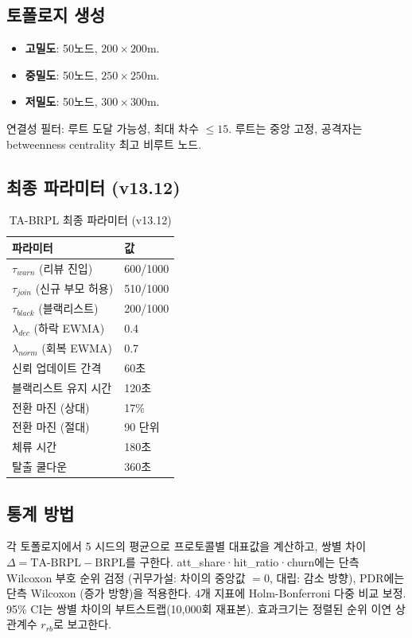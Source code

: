 \documentclass[12pt,a4paper]{article}
\begin{document}
\subsection{토폴로지 생성}

\begin{itemize}
  \item \textbf{고밀도}: 50노드, $200\times200$m.
  \item \textbf{중밀도}: 50노드, $250\times250$m.
  \item \textbf{저밀도}: 50노드, $300\times300$m.
\end{itemize}
연결성 필터: 루트 도달 가능성, 최대 차수 $\le 15$.
루트는 중앙 고정,
공격자는 betweenness centrality 최고 비루트 노드.

\subsection{최종 파라미터 (v13.12)}

\begin{table}[htbp]
\centering
\caption{TA-BRPL 최종 파라미터 (v13.12)}
\label{tab:params}
\begin{tabular}{ll}
\toprule
파라미터 & 값 \\
\midrule
$\tau_{warn}$ (리뷰 진입) & 600/1000 \\
$\tau_{join}$ (신규 부모 허용) & 510/1000 \\
$\tau_{black}$ (블랙리스트) & 200/1000 \\
$\lambda_{dec}$ (하락 EWMA) & 0.4 \\
$\lambda_{norm}$ (회복 EWMA) & 0.7 \\
신뢰 업데이트 간격 & 60초 \\
블랙리스트 유지 시간 & 120초 \\
전환 마진 (상대) & 17\% \\
전환 마진 (절대) & 90 단위 \\
체류 시간 & 180초 \\
탈출 쿨다운 & 360초 \\
\bottomrule
\end{tabular}
\end{table}

\subsection{통계 방법}

각 토폴로지에서 5 시드의 평균으로 프로토콜별 대표값을 계산하고,
쌍별 차이 $\Delta = \text{TA-BRPL} - \text{BRPL}$를 구한다.
att\_share·hit\_ratio·churn에는 단측 Wilcoxon 부호 순위 검정
(귀무가설: 차이의 중앙값 $= 0$, 대립: 감소 방향),
PDR에는 단측 Wilcoxon (증가 방향)을 적용한다.
4개 지표에 Holm-Bonferroni 다중 비교 보정.
95\% CI는 쌍별 차이의 부트스트랩(10,000회 재표본).
효과크기는 정렬된 순위 이연 상관계수 $r_{rb}$로 보고한다.
\end{document}
